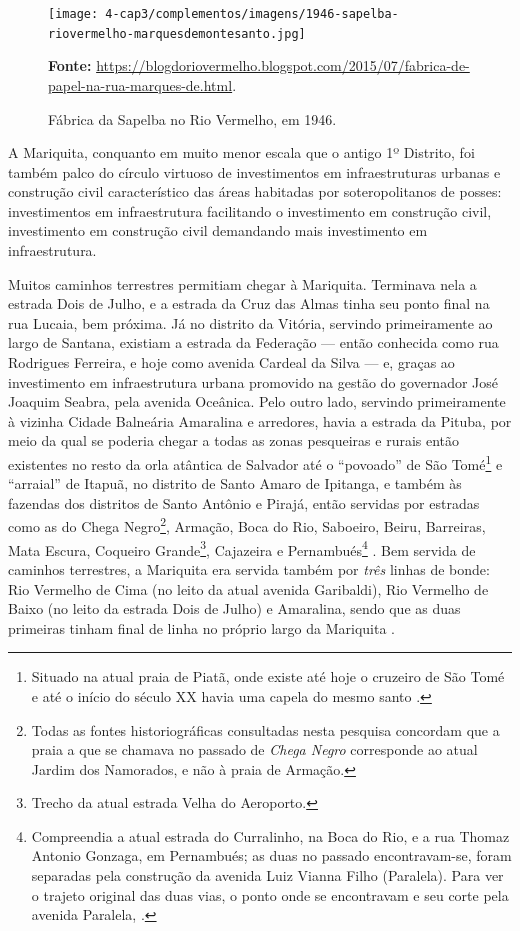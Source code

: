 \begin{figure}[!htp]
\centering
\caption{Fábrica da Sapelba no Rio Vermelho, em 1946.}
\texttt{[image: 4-cap3/complementos/imagens/1946-sapelba-riovermelho-marquesdemontesanto.jpg]}{\par \footnotesize \textbf{Fonte:} \url{https://blogdoriovermelho.blogspot.com/2015/07/fabrica-de-papel-na-rua-marques-de.html}.}
\label{fig:sapelba}
\end{figure}


A Mariquita, conquanto em muito menor escala que o antigo 1º Distrito, foi também palco do círculo virtuoso de investimentos em infraestruturas urbanas e construção civil característico das áreas habitadas por soteropolitanos de posses: investimentos em infraestrutura facilitando o investimento em construção civil, investimento em construção civil demandando mais investimento em infraestrutura.

Muitos caminhos terrestres permitiam chegar à Mariquita. Terminava nela a estrada Dois de Julho, e a estrada da Cruz das Almas tinha seu ponto final na rua Lucaia, bem próxima. Já no distrito da Vitória, servindo primeiramente ao largo de Santana, existiam a estrada da Federação --- então conhecida como rua Rodrigues Ferreira, e hoje como avenida Cardeal da Silva --- e, graças ao investimento em infraestrutura urbana promovido na gestão do governador José Joaquim Seabra, pela avenida Oceânica. Pelo outro lado, servindo primeiramente à vizinha Cidade Balneária Amaralina e arredores, havia a estrada da Pituba, por meio da qual se poderia chegar a todas as zonas pesqueiras e rurais então existentes no resto da orla atântica de Salvador até o ``povoado'' de São Tomé\footnote{Situado na atual praia de Piatã, onde existe até hoje o cruzeiro de São Tomé e até o início do século XX havia uma capela do mesmo santo \cite{silva_cidade_1957}.} e ``arraial'' de Itapuã, no distrito de Santo Amaro de Ipitanga, e também às fazendas dos distritos de Santo Antônio e Pirajá, então servidas por estradas como as do Chega Negro\footnote{Todas as fontes historiográficas consultadas nesta pesquisa concordam que a praia a que se chamava no passado de \textit{Chega Negro} corresponde ao atual Jardim dos Namorados, e não à praia de Armação.}, Armação, Boca do Rio, Saboeiro, Beiru, Barreiras, Mata Escura, Coqueiro Grande\footnote{Trecho da atual estrada Velha do Aeroporto.}, Cajazeira e Pernambués\footnote{Compreendia a atual estrada do Curralinho, na Boca do Rio, e a rua Thomaz Antonio Gonzaga, em Pernambués; as duas no passado encontravam-se, foram separadas pela construção da avenida Luiz Vianna Filho (Paralela). Para ver o trajeto original das duas vias, o ponto onde se encontravam e seu corte pela avenida Paralela, .} \cite{souza_guia_1935}. Bem servida de caminhos terrestres, a Mariquita era servida também por \textit{três} linhas de bonde: Rio Vermelho de Cima (no leito da atual avenida Garibaldi), Rio Vermelho de Baixo (no leito da estrada Dois de Julho) e Amaralina, sendo que as duas primeiras tinham final de linha no próprio largo da Mariquita \cite{souza_guia_1935,stiel_historia_1984}.

